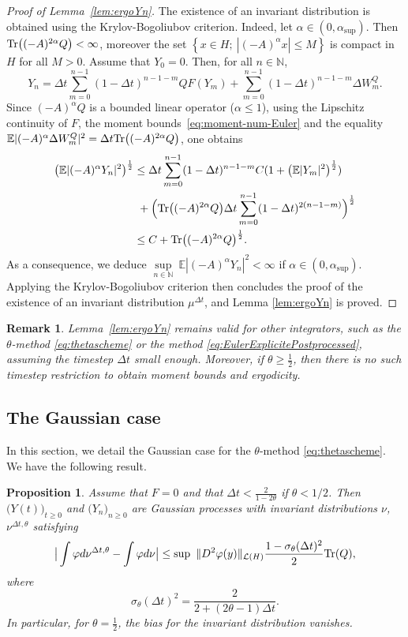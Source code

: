 \documentclass[11pt]{amsart}
\newcommand{\E}{\mathbb{E}}
\newcommand{\N}{\mathbb{N}}
\newtheorem{propo}[theo]{Proposition}
\newtheorem{remark}[theo]{Remark}
\begin{document}
\begin{proof}[Proof of Lemma~\ref{lem:ergoYn}]
The existence of an invariant distribution is obtained using the Krylov-Bogoliubov criterion. Indeed, let $\alpha\in(0,\alpha_{\sup})$. Then ${\rm Tr}\bigl((-A)^{2\alpha}Q\bigr)<\infty$, moreover the set $\left\{x\in H;~|(-A)^\alpha x|\le M\right\}$ is compact in $H$ for all $M>0$.
%
Assume that $Y_0=0$. Then, for all $n\in\N$,
\[
Y_n=\Delta t\sum_{m=0}^{n-1}(1-\Delta t)^{n-1-m}QF(Y_m)+\sum_{m=0}^{n-1}(1-\Delta t)^{n-1-m}\Delta W_m^Q.
\]
Since $(-A)^{\alpha}Q$ is a bounded linear operator ($\alpha\le 1$), using the Lipschitz continuity of $F$, the moment bounds~\eqref{eq:moment-num-Euler} and the equality $\E|(-A)^{\alpha}\Delta W_m^Q|^2=\Delta t{\rm Tr}\bigl((-A)^{2\alpha}Q\bigr)$, one obtains
\begin{align*}
\bigl(\E|(-A)^{\alpha}Y_n|^2\bigr)^{\frac12}&\le \Delta t\sum_{m=0}^{n-1}(1-\Delta t)^{n-1-m}C(1+\bigl(\E|Y_m|^2\bigr)^{\frac12})\\
&~+\Bigl({\rm Tr}\bigl((-A)^{2\alpha}Q\bigr)\Delta t\sum_{m=0}^{n-1}(1-\Delta t)^{2(n-1-m)}\Bigr)^{\frac12}\\
&\le C+{\rm Tr}\bigl((-A)^{2\alpha}Q\bigr)^{\frac12}.
\end{align*}
As a consequence, we deduce $\underset{n\in\N}\sup~\E|(-A)^\alpha Y_n|^2<\infty$ if $\alpha\in(0,\alpha_{\sup})$. Applying the Krylov-Bogoliubov criterion then concludes the proof of the existence of an invariant distribution $\mu^{\Delta t}$, and Lemma \ref{lem:ergoYn} is proved.
\end{proof}


\begin{remark}
Lemma~\ref{lem:ergoYn} remains valid for other integrators, such as the $\theta$-method \eqref{eq:thetascheme} or the method \eqref{eq:EulerExplicitePostprocessed}, assuming the timestep $\Delta t$ small enough.
Moreover, if $\theta\ge \frac12$, then there is no such timestep restriction to obtain moment bounds and ergodicity.
\end{remark}








\subsection{The Gaussian case}

In this section, we detail the Gaussian case for the $\theta$-method \eqref{eq:thetascheme}. We have the following result.
\begin{propo}
Assume that $F=0$ and that $\Delta t<\frac{2}{1-2\theta}$ if $\theta < 1/2$. Then $\bigl(Y(t)\bigr)_{t\ge 0}$ and $\bigl(Y_n\bigr)_{n\ge 0}$ are Gaussian processes with invariant distributions $\nu$, $\nu^{\Delta t,\theta}$ satisfying
\[
\big|\int \varphi d\nu^{\Delta t,\theta}-\int\varphi d\nu\big|
\leq\sup~\|D^2\varphi(y)\|_{\mathcal{L}(H)}\frac{1-\sigma_\theta(\Delta t)^2}{2}{\rm Tr}(Q),
\]
where
\[
\sigma_\theta(\Delta t)^2=\frac{2}{2+(2\theta-1)\Delta t}.
\]
In particular, for $\theta=\frac{1}{2}$, the bias for the invariant distribution vanishes.
\end{propo}
\end{document}
